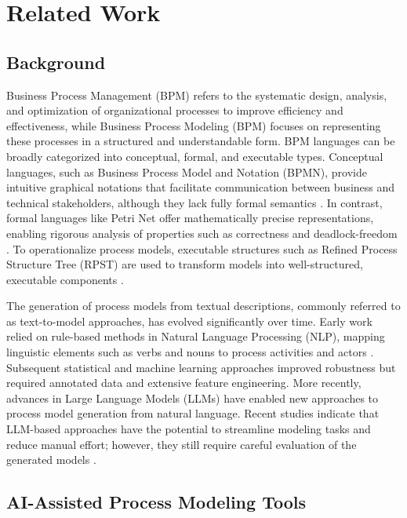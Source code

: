 \chapter{Related Work}
\label{sec:rel}
\section{Background}
Business Process Management (BPM) refers to the systematic design, analysis, and optimization of organizational processes to improve efficiency and effectiveness, while Business Process Modeling (BPM) focuses on representing these processes in a structured and understandable form. BPM languages can be broadly categorized into conceptual, formal, and executable types. Conceptual languages, such as Business Process Model and Notation (BPMN), provide intuitive graphical notations that facilitate communication between business and technical stakeholders, although they lack fully formal semantics \cite{omg2011bpmn}. In contrast, formal languages like Petri Net offer mathematically precise representations, enabling rigorous analysis of properties such as correctness and deadlock-freedom \cite{vanderAalst1998}. To operationalize process models, executable structures such as Refined Process Structure Tree (RPST) are used to transform models into well-structured, executable components \cite{vanhatalo2009rpst}.

The generation of process models from textual descriptions, commonly referred to as text-to-model approaches, has evolved significantly over time. Early work relied on rule-based methods in Natural Language Processing (NLP), mapping linguistic elements such as verbs and nouns to process activities and actors \cite{friedrich2011process}. Subsequent statistical and machine learning approaches improved robustness but required annotated data and extensive feature engineering. More recently, advances in Large Language Models (LLMs) have enabled new approaches to process model generation from natural language. Recent studies indicate that LLM-based approaches have the potential to streamline modeling tasks and reduce manual effort; however, they still require careful evaluation of the generated models \cite{daclin2024gai4bm, kourani2024llm}.

\section{AI-Assisted Process Modeling Tools}


